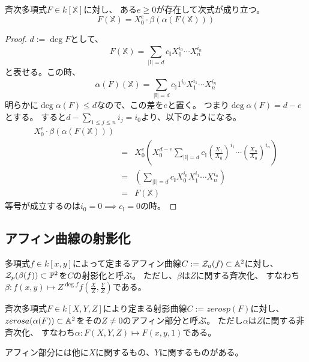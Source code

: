 \documentclass[a4paper]{jsarticle}
\begin{document}
    \begin{Lemma}
        斉次多項式$F \in k[\mathbb{X}]$に対し、
        ある$e \geq 0$が存在して次式が成り立つ。
        \[ F(\mathbb{X}) = X_0^e \cdot \beta(\alpha(F(\mathbb{X})))\]
    \end{Lemma}
    \begin{proof}
        $d:=\deg F$として、
        \[ F(\mathbb{X}) = \sum_{|\mathbb{I}|=d}{c_{\mathbb{I}} X_0^{i_0} \cdots X_n^{i_n}}\]
        と表せる。この時、
        \[ \alpha(F)(\mathbb{X}) = \sum_{|\mathbb{I}|=d}{c_{\mathbb{I}} 1^{i_0} X_1^{i_1} \cdots X_n^{i_n}}\]
        明らかに$\deg \alpha(F) \leq d$なので、この差を$e$と置く。
        つまり$\deg \alpha(F)=d-e$とする。
        すると$d-\sum_{1 \leq j \leq n}{i_j}=i_0$より、以下のようになる。
        \begin{eqnarray*}
            X_0^e \cdot \beta(\alpha(F(\mathbb{X}))) \\
            &=& X_0^e
            \left(
                X_0^{d-e}
                \sum_{|\mathbb{I}|=d}{c_{\mathbb{I}} \left(\frac{X_1}{X_0}\right)^{i_1} \cdots \left(\frac{X_n}{X_0}\right)^{i_n}}
            \right) \\
            &=&
            \left(
                \sum_{|\mathbb{I}|=d}{c_{\mathbb{I}} X_0^{i_0} X_1^{i_1} \cdots X_n^{i_n}}
            \right) \\
            &=& F(\mathbb{X})
        \end{eqnarray*}
        等号が成立するのは$i_0=0 \implies c_{\mathbb{I}}=0$の時。
        
    \end{proof}

    \subsection{アフィン曲線の射影化}
    \begin{Def}
        多項式$f \in k[x,y]$によって定まるアフィン曲線$C:=\mathcal{Z}_a(f) \subset \mathbb{A}^2$に対し、
        $\mathcal{Z}_p(\beta(f)) \subset \mathbb{P}^2$を$C$の射影化と呼ぶ。
        ただし、$\beta$は$Z$に関する斉次化、
        すなわち$\beta : f(x, y) \mapsto Z^{\deg f}f \left( \frac{X}{Z},\frac{Y}{Z}\right)$である。
    \end{Def}

    \begin{Def}
        斉次多項式$F \in k[X, Y, Z]$により定まる射影曲線$C:=zerosp(F)$に対し、
        $zerosa(\alpha(F)) \subset \mathbb{A}^2$をその$Z \neq 0$のアフィン部分と呼ぶ。
        ただし$\alpha$は$Z$に関する非斉次化、
        すなわち$\alpha : F(X, Y, Z) \mapsto F(x, y, 1)$である。
    \end{Def}
    アフィン部分には他に$X$に関するもの、$Y$に関するものがある。
\end{document}
